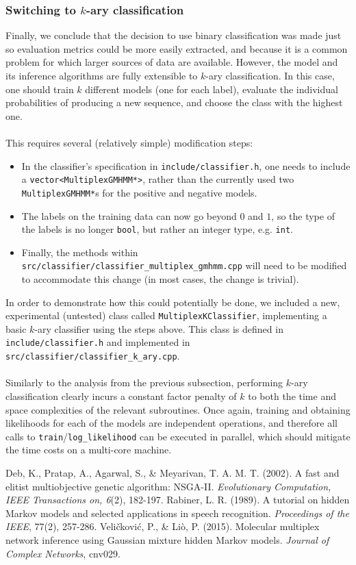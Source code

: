 \documentclass[12pt]{article}
\begin{document}
	\subsubsection{Switching to $k$-ary classification}\label{sec:kary}
	Finally, we conclude that the decision to use binary classification was made just so evaluation metrics could be more easily extracted, and because it is a common problem for which larger sources of data are available. However, the model and its inference algorithms are fully extensible to $k$-ary classification. In this case, one should train $k$ different models (one for each label), evaluate the individual probabilities of producing a new sequence, and choose the class with the highest one.\\ \\
	This requires several (relatively simple) modification steps:
	\begin{itemize}
		\item In the classifier's specification in {\tt include/classifier.h}, one needs to include a {\tt vector<MultiplexGMHMM*>}, rather than the currently used two {\tt MultiplexGMHMM*}s for the positive and negative models.
		\item The labels on the training data can now go beyond $0$ and $1$, so the type of the labels is no longer {\tt bool}, but rather an integer type, e.g. {\tt int}.
		\item Finally, the methods within {\tt src/classifier/classifier\_multiplex\_gmhmm.cpp} will need to be modified to accommodate this change (in most cases, the change is trivial).
	\end{itemize}
	In order to demonstrate how this could potentially be done, we included a new, experimental (untested) class called {\tt MultiplexKClassifier}, implementing a basic $k$-ary classifier using the steps above. This class is defined in {\tt include/classifier.h} and implemented in {\tt src/classifier/classifier\_k\_ary.cpp}.\\ \\
	Similarly to the analysis from the previous subsection, performing $k$-ary classification clearly incurs a constant factor penalty of $k$ to both the time and space complexities of the relevant subroutines. Once again, training and obtaining likelihoods for each of the models are independent operations, and therefore all calls to {\tt train}/{\tt log\_likelihood} can be executed in parallel, which should mitigate the time costs on a multi-core machine.
	\begin{thebibliography}{9}
 Deb, K., Pratap, A., Agarwal, S., \& Meyarivan, T. A. M. T. (2002). A fast and elitist multiobjective genetic algorithm: NSGA-II. \emph{Evolutionary Computation, IEEE Transactions on, 6}(2), 182-197.
 Rabiner, L. R. (1989). A tutorial on hidden Markov models and selected applications in speech recognition. \emph{Proceedings of the IEEE}, 77(2), 257-286.
 Veli\v{c}kovi\'{c}, P., \& Li\`{o}, P. (2015). Molecular multiplex network inference using Gaussian mixture hidden Markov models. \emph{Journal of Complex Networks}, cnv029.
\end{thebibliography}
	
\end{document}
